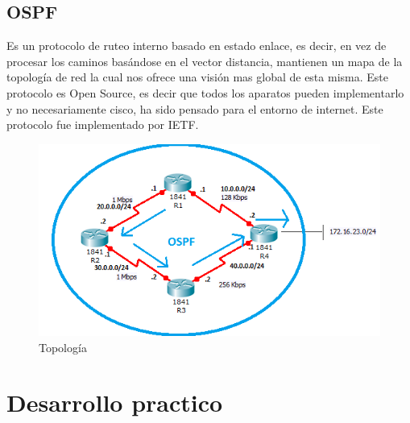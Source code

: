 \documentclass[spanish]{udpreport}
\begin{document}
\section{OSPF}
Es un protocolo de ruteo interno basado en estado enlace, es decir, en vez de procesar los caminos basándose en el vector distancia, mantienen un mapa de la topología de red la cual nos ofrece una visión mas global de esta misma. Este protocolo es Open Source, es decir que todos los aparatos pueden implementarlo y no necesariamente cisco, ha sido pensado para el entorno de internet. Este protocolo fue implementado por IETF.
\begin{figure}[h]
    \centering
    \includegraphics[scale=0.3]{images/osp.png}
    \caption{Topología}
    \label{fig:my_label}
\end{figure}
\chapter{Desarrollo practico}
\end{document}
